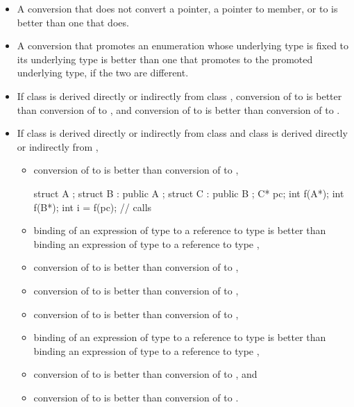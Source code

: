 \begin{itemize}
\item
A conversion that does not convert a pointer,
a pointer to member, or 
to
is better than one that does.

\item
A conversion that promotes an enumeration whose underlying type is fixed to its underlying
type is better than one that promotes to the promoted underlying type, if the two are
different.

\item
If class
is derived directly or indirectly from class
,
conversion of
to
is better than conversion of
to
,
and conversion of
to
is better than conversion
of
to
.
\item
If class
is derived directly or indirectly from class
and class
is derived directly or indirectly from
,

\begin{itemize}
\item
conversion of
to
is better than conversion of
to
,
\begin{example}

\begin{codeblock}
struct A {};
struct B : public A {};
struct C : public B {};
C* pc;
int f(A*);
int f(B*);
int i = f(pc);                  // calls 
\end{codeblock}
\end{example}

\item
binding of an expression of type
to a reference to type
is better than binding an expression of type
to a reference to type
,
\item
conversion of
to
is better than conversion of
to
,
\item
conversion of
to
is better than conversion of
to
,
\item
conversion of
to
is better than conversion of
to
,
\item
binding of an expression of type
to a reference to type
is better than binding an expression of type
to a
reference to type
,
\item
conversion of
to
is better than conversion
of
to
,
and
\item
conversion of
to
is better than conversion of
to
.
\end{itemize}


\end{itemize}
